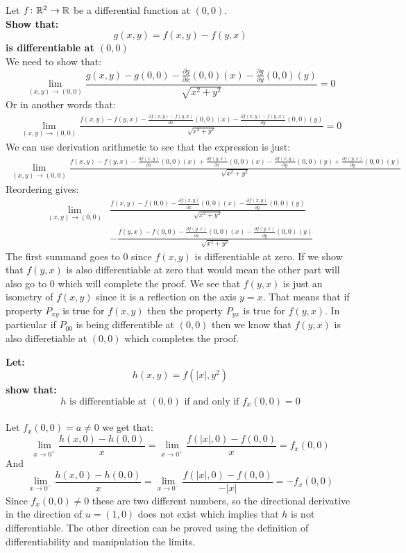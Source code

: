 \documentclass[11pt,a4paper]{article}
\begin{document}
	Let $f\colon\mathbb{R}^2\to\mathbb{R}$ be a differential function at $(0,0)$. \\
	\textbf{Show that:
	\[
		g(x,y) = f(x,y) - f(y,x)
	\]
	is differentiable at $(0,0)$} \\
	We need to show that:
	\[
		\lim_{(x,y)\to(0,0)}{\frac{g(x,y)-g(0,0)-\frac{\partial g}
		{\partial x}(0,0)(x) - \frac{\partial g}{\partial y}(0,0)
		(y)}{\sqrt{x^2+y^2}}} = 0
	\]
	Or in another words that:
	\begin{align*}
		\lim_{(x,y)\to(0,0)} {\frac{f(x,y) - f(y,x) 
		-\frac{\partial f(x,y) - f(y,x)}
		{\partial x}(0,0)(x) - \frac{\partial f(x,y) - f(y,x)}
		{\partial y}(0,0)(y)}{\sqrt{x^2+y^2}}} = 0
	\end{align*}
	We can use derivation arithmetic to see that the expression is just:
	\begin{align*}
		\lim_{(x,y)\to(0,0)} {
		\frac{f(x,y) - f(y,x) -
		\frac{\partial f(x,y)}{\partial x}(0,0)(x) +
		\frac{\partial f(y,x)}{\partial x}(0,0)(x) - 
		\frac{\partial f(x,y)}{\partial y}(0,0)(y) + 
		\frac{\partial f(y,x)}{\partial y}(0,0)(y)}
		{\sqrt{x^2+y^2}}}
	\end{align*}
	Reordering gives:
	\begin{align*}
		\lim_{(x,y)\to(0,0)} &{
		\frac{
		f(x,y)
		-f(0,0)
		-\frac{\partial f(x,y)}{\partial x}(0,0)(x) 
		-\frac{\partial f(x,y)}{\partial y}(0,0)(y)
		}
		{\sqrt{x^2+y^2}}} \\ & -
		\frac{
		f(y,x)
		-f(0,0)
		-\frac{\partial f(y,x)}{\partial x}(0,0)(x)  
		-\frac{\partial f(y,x)}{\partial y}(0,0)(y)
		}
		{\sqrt{x^2+y^2}}
	\end{align*}
	The first summand goes to $0$ since $f(x,y)$ is differentiable at zero. 
	If we show that $f(y,x)$ is also differentiable at zero that would mean the 
	other  part will also go to $0$ which will complete the proof. We see that 
	$f(y,x)$ is just an isometry of $f(x,y)$ since it is a reflection on the axis
	$y=x$. That means that if property $P_{xy}$ is true for $f(x,y)$ then
	the property $P_{yx}$ is true for $f(y,x)$. In particular if $P_{00}$ is
	being differentible at $(0,0)$ then we know that $f(y,x)$ is also
	differetiable at $(0,0)$ which completes the proof.
	
	\newpage
	
	\textbf{Let:
	\[
		h(x,y) = f(\vert x\vert,y^2)
	\]
	show that: 
	\[
		h \text{ is differentiable at } (0,0) 
		\text{ if and only if }
		f_x(0,0)=0
	\]} \\
	Let $f_x(0,0) = a \neq 0$ we get that:
	\[
		\lim_{x\to 0^+}\frac
		{h(x,0) - h(0,0)}
		{x} = 
		\lim_{x\to 0^+}\frac
		{f(|x|,0) - f(0,0)}
		{x} = f_x(0,0)
	\]
	And
	\[
		\lim_{x\to 0^-}\frac
		{h(x,0) - h(0,0)}
		{x} = 
		\lim_{x\to 0^-}\frac
		{f(|x|,0) - f(0,0)}
		{-|x|} = -f_x(0,0)
	\]
	Since $f_x(0,0) \neq 0$ these are two different numbers,
	so the directional derivative in the direction of $u = (1,0)$ does not
	exist which implies  that $h$ is not differentiable. The other direction
	can be proved using the definition of differentiability and manipulation
	the limits.
	
\end{document}

